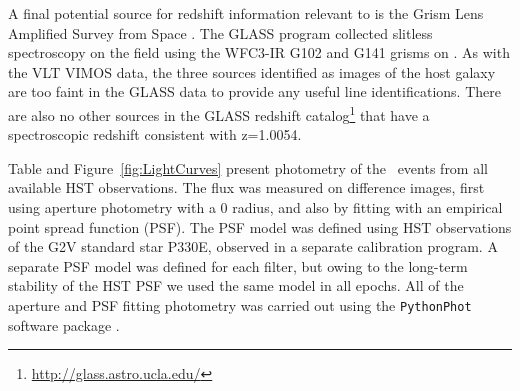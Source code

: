 A final potential source for redshift information relevant to \spock
is the Grism Lens Amplified Survey from Space \citep[GLASS; PID:
  HST-GO-13459; PI:T. Treu][]{Schmidt:2014,Treu:2015a}. The GLASS
program collected slitless spectroscopy on the  field using
the WFC3-IR G102 and G141 grisms on \HST.  As with the VLT VIMOS data,
the three sources identified as images of the \spock host galaxy are
too faint in the GLASS data to provide any useful line
identifications.  There are also no other sources in the GLASS
redshift catalog\footnote{\url{http://glass.astro.ucla.edu/}} that
have a spectroscopic redshift consistent with z=1.0054.

Table  %
and Figure~\ref{fig:LightCurves} present 
photometry of the \spock\ events
from all available HST observations. The flux was measured on
difference images, first using aperture photometry with a 0
radius, and also by fitting with an empirical point spread function
(PSF).  The PSF model was defined using HST observations of the G2V
standard star P330E, observed in a separate calibration program.  A
separate PSF model was defined for each filter, but owing to the
long-term stability of the HST PSF we used the same model in all
epochs.  All of the aperture and PSF fitting photometry was carried
out using the {\tt PythonPhot} software package \citep{Jones:2015}.
